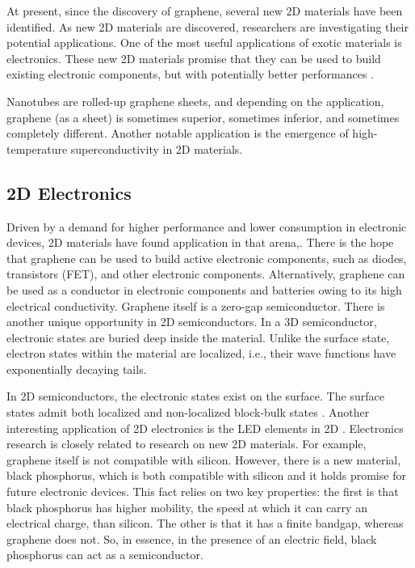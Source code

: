 At present, since the discovery of graphene, several new 2D materials have been identified\cite{Many2DMaterials}. 
As new 2D materials are discovered, researchers are investigating their potential applications. One of the most useful applications of exotic materials is electronics. These new 2D materials promise that they can be used to build existing electronic components, but with potentially better performances \cite{2DEJour1}\cite{2DEJour2}.

Nanotubes are rolled-up graphene sheets, and depending on the application, graphene (as a sheet) is sometimes superior, sometimes inferior, and sometimes completely different. Another notable application is the emergence of high-temperature superconductivity in 2D materials\cite{2DSuper}.

\subsection*{2D Electronics}
Driven by a demand for higher performance and lower consumption in electronic devices, 2D materials have found application in that arena\cite{2DEJour1},\cite{2DEJour2}. 
There is the hope that graphene can be used to build active electronic components, such as diodes, transistors (FET), and other electronic components. Alternatively, graphene can be used as a conductor in electronic components and batteries owing to its high electrical conductivity. Graphene itself is a zero-gap semiconductor. There is another unique opportunity in 2D semiconductors. In a 3D semiconductor, electronic states are buried deep inside the material. Unlike the surface state, electron states within the material are localized, i.e., their wave functions have exponentially decaying tails.

In 2D semiconductors, the electronic states exist
on the surface. The surface states admit both localized and non-localized block-bulk states \cite{LocStates}.
Another interesting application of 2D electronics is the LED elements in 2D \cite{2DLED}. Electronics research is closely related to research on new 2D materials. For example, graphene itself is not compatible with silicon. However, there is a new material, black phosphorus\cite{2DPhos}, which is both compatible with silicon and it holds promise for future electronic\cite{2DPhos3} devices. This fact relies on two key properties: the first is that black phosphorus has higher mobility, the speed at which it can carry an electrical charge, than silicon. The other is that it has a finite bandgap, whereas graphene does not. So, in essence, in the presence of an electric field, black phosphorus can act as a semiconductor\cite{2DPhos2}.

